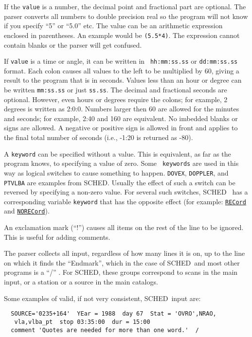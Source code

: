 \documentclass{report}
\newcommand{\sched}{{\sc SCHED}}
\newcommand{\schedb}{{\sc SCHED~}}
\begin{document}
If the {\tt value} is a number, the decimal point and fractional part are
optional.  The parser converts all numbers to double precision real so
the program will not know if you specify ``5'' or ``5.0'' etc.  The
value can be an arithmetic expression enclosed in parentheses.  An
example would be {\tt (5.5*4)}.  The expression cannot contain
blanks or the parser will get confused.

If {\tt value} is a time or angle, it can be written in {\tt
hh:mm:ss.ss} or {\tt dd:mm:ss.ss} format. Each colon causes all values
to the left to be multiplied by 60, giving a result to the program
that is in seconds. Values less than an hour or degree can be written
{\tt mm:ss.ss} or just {\tt ss.ss}. The decimal and fractional seconds
are optional.  However, even hours or degrees require the colons; for
example, 2 degrees is written as 2:0:0. Numbers larger then 60 are
allowed for the minutes and seconds; for example, 2:40 and 160 are
equivalent.  No imbedded blanks or signs are allowed.  A negative
or positive sign is allowed in front and applies to the final total
number of seconds (i.e., -1:20 is returned as -80).

A {\tt keyword} can be specified without a value. This is equivalent,
as far as the program knows, to specifying a value of zero. Some {\tt
keywords} are used in this way as logical switches to cause something
to happen. {\tt DOVEX}, {\tt DOPPLER}, and {\tt PTVLBA} are examples from
\sched. Usually the effect of such a switch can be reversed by
specifying a non-zero value.  For several such switches, \schedb
has a corresponding variable {\tt keyword} that has the opposite effect
(for example: 
{\hyperref[MP:RECORD]{{\tt RECord}}} and 
{\hyperref[MP:RECORD]{{\tt NORECord}}}).

An exclamation mark (``!'') causes all items on the rest of the line
to be ignored. This is useful for adding comments.

The parser collects all input, regardless of how many lines it is on,
up to the line on which it finds the ``Endmark'', which in the case of
\schedb and most other programs is a ``/'' .  For \sched, these
groups correspond to scans in the main input, or a station or a source
in the main catalogs.

Some examples of valid, if not very consistent, \schedb input are:

\begin{verbatim}
  SOURCE='0235+164'  YEar = 1988  day 67  Stat = 'OVRO',NRAO,
   vla,vlba_pt  stop 03:35:00  dur = 15:00
  comment 'Quotes are needed for more than one word.'  /
\end{verbatim}
\end{document}
